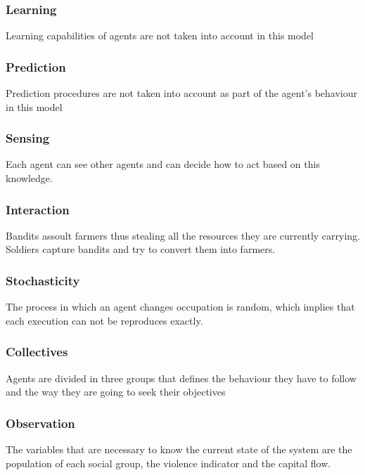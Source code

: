 \documentclass{wscpaperproc}
\theoremstyle{wsc}
\begin{document}
\subsubsection{Learning}

Learning capabilities of agents are not taken into account in this model

\subsubsection{Prediction}

Prediction procedures are not taken into account as part of the agent's
behaviour in this model

\subsubsection{Sensing}

Each agent can see other agents and can decide how to act based on this
knowledge.

\subsubsection{Interaction}

Bandits assoult farmers thus stealing all the resources they are currently
carrying. Soldiers capture bandits and try to convert them into farmers.

\subsubsection{Stochasticity}

The process in which an agent changes occupation is random, which implies that
each execution can not be reproduces exactly.

\subsubsection{Collectives}

Agents are divided in three groups that defines the behaviour they have to
follow and the way they are going to seek their objectives

\subsubsection{Observation}

The variables that are necessary to know the current state of the system are
the population of each social group, the violence indicator and the capital
flow.
\end{document}

